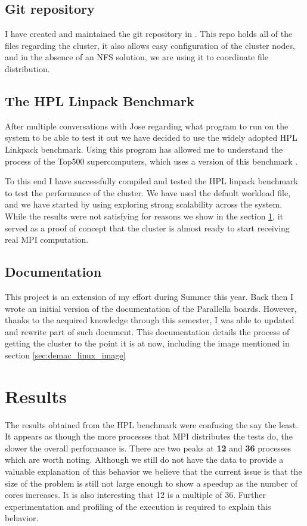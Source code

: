 \documentclass[letterpaper,12pt]{article}
\begin{document}
\subsection{Git repository}
I have created and maintained the git repository in \cite{demac_git_repo}. This repo holds all of the files regarding the cluster, it also allows easy configuration of the cluster nodes, and in the absence of an NFS solution, we are using it to coordinate file distribution.


\subsection{The HPL Linpack Benchmark}
After multiple conversations with Jose regarding what program to run on the system to be able to test it out we have decided to use the widely adopted HPL Linkpack benchmark. Using this program has allowed me to understand the process of the Top500 supercomputers, which uses a version of this benchmark \cite{top500_linpack}.

To this end I have successfully compiled and tested the HPL linpack benchmark to test the performance of the cluster. We have used the default workload file, and we have started by using exploring strong scalability across the system. While the results were not satisfying for reasons we show in the section \ref{sec:results}, it served as a proof of concept that the cluster is almost ready to start receiving real MPI computation.

\subsection{Documentation}
This project is an extension of my effort during Summer this year. Back then I wrote an initial version of the documentation of the Parallella boards. However, thanks to the acquired knowledge through this semester, I was able to updated and rewrite part of such document. This documentation details the process of getting the cluster to the point it is at now, including the image mentioned in section \ref{sec:demac_linux_image}

\section{Results} \label{sec:results}
The results obtained from the HPL benchmark were confusing the say the least. It appears as though the more processes that MPI distributes the tests do, the slower the overall performance is. There are two peaks at \textbf{12} and \textbf{36} processes which are worth noting. Although we still do not have the data to provide a valuable explanation of this behavior we believe that the current issue is that the size of the problem is still not large enough to show a speedup as the number of cores increases. It is also interesting that 12 is a multiple of 36. Further experimentation and profiling of the execution is required to explain this behavior.
\end{document}
